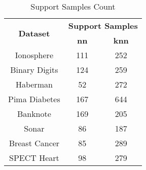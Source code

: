 \begin{table}[htbp]
\caption{Support Samples Count}
\begin{center}
\begin{tabular}{|c|c|c|}
\hline
\multirow{2}{*}{\textbf{Dataset}} & \multicolumn{2}{c|}{\textbf{Support Samples}} \\ \cline{2-3}
 & \textbf{nn} & \textbf{knn} \\ \hline
Ionosphere & 111 & 252 \\ \hline
Binary Digits & 124 & 259 \\ \hline
Haberman & 52 & 272 \\ \hline
Pima Diabetes & 167 & 644 \\ \hline
Banknote & 169 & 205 \\ \hline
Sonar & 86 & 187 \\ \hline
Breast Cancer & 85 & 289 \\ \hline
SPECT Heart & 98 & 279 \\ \hline
\end{tabular}
\label{tab:support}
\end{center}
\end{table}